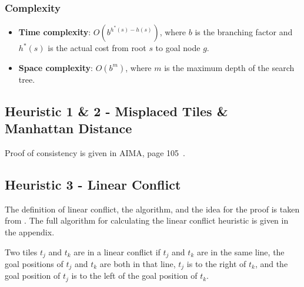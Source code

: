 \documentclass{llncs}
\begin{document}
\subsubsection{Complexity}
\begin{itemize}
	\item[] \textbf{Time complexity}: $O(b^{h^*(s)-h(s)})$, where $b$ is the branching factor and $h^*(s)$ is the actual cost from root $s$ to goal node $g$.
	\item[] \textbf{Space complexity}: $O(b^m)$, where $m$ is the maximum depth of the search tree.
\end{itemize}

\subsection{Heuristic 1 \& 2 - Misplaced Tiles \& Manhattan Distance}

Proof of consistency is given in AIMA, page 105~\cite{aima}.

\subsection{Heuristic 3 - Linear Conflict}

The definition of linear conflict, the algorithm, and the idea for the proof is taken from \cite{lc}.
The full algorithm for calculating the linear conflict heuristic is given in the appendix.

\begin{definition}
Two tiles $t_j$ and $t_k$ are in a linear conflict if $t_j$ and $t_k$ are in the same line, the goal positions of $t_j$ and $t_k$ are both in that line, $t_j$ is to the right of $t_k$, and the goal position of $t_j$ is to the left of the goal position of $t_k$.
\end{definition}
\end{document}
